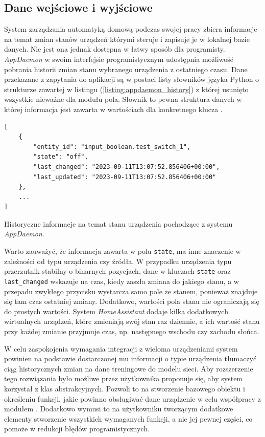 \subsection{Dane wejściowe i wyjściowe}
System zarządzania automatyką domową podczas swojej pracy zbiera informacje na temat zmian stanów urządzeń którymi steruje i zapisuje je w lokalnej bazie danych. Nie jest ona jednak dostępna w łatwy sposób dla programisty. \textit{AppDaemon} w swoim interfejsie programistycznym udostępnia możliwość pobrania historii zmian stanu wybranego urządzenia z ostatniego czasu. Dane przekazane z zapytania do aplikacji są w postaci listy słowników języka Python o strukturze zawartej w listingu (\ref{listing:appdaemon_history}) z której usunięto wszystkie nieważne dla modułu pola. Słownik to pewna struktura danych w której informacja jest zawarta w wartościach dla konkretnego klucza \cite{book:learning_python}.

\begin{listing}
\begin{verbatim}
[
    {
        "entity_id": "input_boolean.test_switch_1",
        "state": "off",
        "last_changed": "2023-09-11T13:07:52.856406+00:00",
        "last_updated": "2023-09-11T13:07:52.856406+00:00"
    },
    ...
]
\end{verbatim}
\caption{Historyczne informacje na temat stanu urządzenia pochodzące z systemu \textit{AppDaemon}.} \label{listing:appdaemon_history}
\end{listing}

Warto zauważyć, że informacja zawarta w polu \verb+state+, ma inne znaczenie w zależności od typu urządzenia czy źródła. W przypadku urządzenia typu przerzutnik stabilny o binarnych pozycjach, dane w kluczach \verb+state+ oraz \verb+last_changed+ wskazuje na czas, kiedy zaszła zmiana do jakiego stanu, a w przepadu zwykłego przycisku wystarcza samo pole ze stanem, ponieważ znajduje się tam czas ostatniej zmiany. Dodatkowo, wartości pola stanu nie ograniczają się do prostych wartości. System \textit{HomeAssistant} dodaje kilka dodatkowych wirtualnych urządzeń, które zmieniają swój stan raz dziennie, a ich wartość stanu przy każdej zmianie przyjmuje czas, np. następnego wschodu czy zachodu słońca.

W celu zaspokojenia wymagania integracji z wieloma urządzeniami system powinien na podstawie dostarczonej mu informacji o typie urządzenia tłumaczyć ciąg historycznych zmian na dane treningowe do modelu sieci. Aby rozszerzenie tego rozwiązania było możliwe przez użytkownika proponuje się, aby system korzystał z klas abstrakcyjnych. Pozwoli to na stworzenie bazowego obiektu i określeniu funkcji, jakie powinno obsługiwać dane urządzenie w celu współpracy z modułem \cite{book:czysty_kod}. Dodatkowo wymusi to na użytkowniku tworzącym dodatkowe elementy stworzenie wszystkich wymaganych funkcji, a nie jej pewnej części, co pomoże w redukcji błędów programistycznych.

